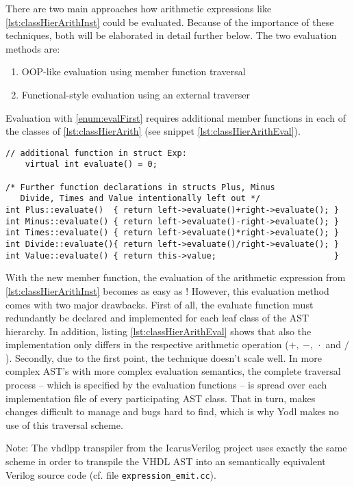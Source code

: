 There are two main approaches how arithmetic expressions like
\ref{lst:classHierArithInst} could be evaluated. Because of the
importance of these techniques, both will be elaborated in detail
further below. The two evaluation methods are:
%
\begin{enumerate}
    \item \label{enum:evalFirst} OOP-like evaluation using member function traversal
    \item \label{enum:evalSec} Functional-style evaluation using an external traverser
\end{enumerate}
%
Evaluation with \ref{enum:evalFirst} requires additional member
functions in each of the classes of \ref{lst:classHierArith} (see
snippet \ref{lst:classHierArithEval}).
%
\begin{lstlisting}[style=c++,caption={Eval functions for expression
      AST},label={lst:classHierArithEval}]
// additional function in struct Exp:
    virtual int evaluate() = 0;

/* Further function declarations in structs Plus, Minus
   Divide, Times and Value intentionally left out */
int Plus::evaluate()  { return left->evaluate()+right->evaluate(); }
int Minus::evaluate() { return left->evaluate()-right->evaluate(); }
int Times::evaluate() { return left->evaluate()*right->evaluate(); }
int Divide::evaluate(){ return left->evaluate()/right->evaluate(); }
int Value::evaluate() { return this->value;                        }
\end{lstlisting}
%
With the new  member function, the evaluation of the
arithmetic expression from \ref{lst:classHierArithInst}
becomes as easy as !
However, this evaluation method comes with two major drawbacks. First
of all, the evaluate function must redundantly be declared and
implemented for each leaf class of the AST hierarchy. In addition, listing
\ref{lst:classHierArithEval} shows that also the implementation only
differs in the respective arithmetic operation (\(+,\ -,\ \cdot\)
and \(/\)). Secondly, due to
the first point, the technique doesn't scale well. In more complex
AST's with more complex evaluation semantics, the complete traversal
process -- which is specified by the evaluation functions -- is spread
over each implementation file of every participating AST
class. That in turn, makes changes difficult to manage and bugs hard
to find, which is why Yodl makes no use of this traversal scheme.

Note: The vhdlpp transpiler from the IcarusVerilog project uses
exactly the same
scheme in order to transpile the VHDL AST into an semantically
equivalent Verilog source code (cf. \cite{VHDLPPREPO} file
\texttt{expression_emit.cc}).

